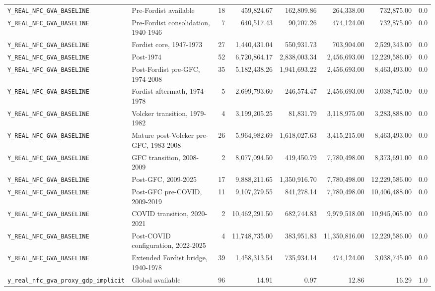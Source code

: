 \begin{landscape}
\begin{longtable}{p{4.4cm}p{3.8cm}rrrrrr}
\\
\nolinkurl{Y_REAL_NFC_GVA_BASELINE} & Pre-Fordist available & 18 & 459,824.67 & 162,809.86 & 264,338.00 & 732,875.00 & 0.0
\\
\nolinkurl{Y_REAL_NFC_GVA_BASELINE} & Pre-Fordist consolidation, 1940-1946 & 7 & 640,517.43 & 90,707.26 & 474,124.00 & 732,875.00 & 0.0
\\
\nolinkurl{Y_REAL_NFC_GVA_BASELINE} & Fordist core, 1947-1973 & 27 & 1,440,431.04 & 550,931.73 & 703,904.00 & 2,529,343.00 & 0.0
\\
\nolinkurl{Y_REAL_NFC_GVA_BASELINE} & Post-1974 & 52 & 6,720,864.17 & 2,838,003.34 & 2,456,693.00 & 12,229,586.00 & 0.0
\\
\nolinkurl{Y_REAL_NFC_GVA_BASELINE} & Post-Fordist pre-GFC, 1974-2008 & 35 & 5,182,438.26 & 1,941,693.22 & 2,456,693.00 & 8,463,493.00 & 0.0
\\
\nolinkurl{Y_REAL_NFC_GVA_BASELINE} & Fordist aftermath, 1974-1978 & 5 & 2,699,793.60 & 246,574.47 & 2,456,693.00 & 3,038,745.00 & 0.0
\\
\nolinkurl{Y_REAL_NFC_GVA_BASELINE} & Volcker transition, 1979-1982 & 4 & 3,199,205.25 & 81,831.79 & 3,118,975.00 & 3,283,888.00 & 0.0
\\
\nolinkurl{Y_REAL_NFC_GVA_BASELINE} & Mature post-Volcker pre-GFC, 1983-2008 & 26 & 5,964,982.69 & 1,618,027.63 & 3,415,215.00 & 8,463,493.00 & 0.0
\\
\nolinkurl{Y_REAL_NFC_GVA_BASELINE} & GFC transition, 2008-2009 & 2 & 8,077,094.50 & 419,450.79 & 7,780,498.00 & 8,373,691.00 & 0.0
\\
\nolinkurl{Y_REAL_NFC_GVA_BASELINE} & Post-GFC, 2009-2025 & 17 & 9,888,211.65 & 1,350,916.70 & 7,780,498.00 & 12,229,586.00 & 0.0
\\
\nolinkurl{Y_REAL_NFC_GVA_BASELINE} & Post-GFC pre-COVID, 2009-2019 & 11 & 9,107,279.55 & 841,278.14 & 7,780,498.00 & 10,406,488.00 & 0.0
\\
\nolinkurl{Y_REAL_NFC_GVA_BASELINE} & COVID transition, 2020-2021 & 2 & 10,462,291.50 & 682,744.83 & 9,979,518.00 & 10,945,065.00 & 0.0
\\
\nolinkurl{Y_REAL_NFC_GVA_BASELINE} & Post-COVID configuration, 2022-2025 & 4 & 11,748,735.00 & 383,951.83 & 11,350,816.00 & 12,229,586.00 & 0.0
\\
\nolinkurl{Y_REAL_NFC_GVA_BASELINE} & Extended Fordist bridge, 1940-1978 & 39 & 1,458,313.54 & 735,934.14 & 474,124.00 & 3,038,745.00 & 0.0
\\
\nolinkurl{y_real_nfc_gva_proxy_gdp_implicit} & Global available & 96 & 14.91 & 0.97 & 12.86 & 16.29 & 1.0

\end{longtable}
\end{landscape}

